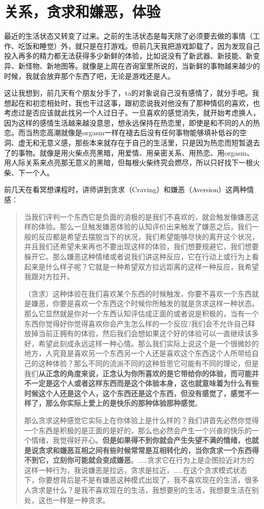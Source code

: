 \chapter{关系，贪求和嫌恶，体验}



最近的生活状态又转变了过来。之前的生活状态是每天除了必须要去做的事情（工作、吃饭和睡觉）外，就只是在打游戏。但前几天我把游戏卸载了，因为发现自己投入再多的精力都无法获得多少新鲜的体验，比如说没有了新武器、新技能、新变异、新怪物、新地图等。就像是上周在咨询室里所说的，当新鲜的事物越来越少的时候，我就会放弃那个东西了吧，无论是游戏还是人。

这让我想到，前几天有个朋友分手了，ta的对象说自己没有感情了，就分手吧。我想起在和初恋相处时，我也干过这事，跟初恋说我对他没有了那种情侣的喜欢，也考虑过是否应该就此找另一个人过日子。一旦喜欢的感觉消失，就开始考虑换人，因为这样的感情生活越来越没意思，想永远保持在热恋里，即使是和不同的人的热恋。而当热恋高潮\pozhehao{}就像是orgasm一样\pozhehao{}在褪去后没有任何事物能够填补低谷的空洞、虚无和无意义感，那些本来就存在于自己的生活里，只是因为热恋而短暂退去了的事物。就像是用火柴点亮黑暗，用爱情、用亲密关系、用热恋、用orgasm、用人际关系来点亮那无意义的黑暗，但每根火柴终究会燃尽，所以只好找下一根火柴、下一个人。

前几天在看冥想课程时，讲师讲到贪求（Craving）和嫌恶（Aversion）这两种情感：

\blockquote{
	当我们评判一个东西它是负面的消极的是我们不喜欢的，就会触发像嫌恶这样的体验。那么一旦触发嫌恶体验的认知评价出来触发了嫌恶之后，我们一般的反应都是希望去摆脱当下的状况，我们希望能够尽快的离开这个状况，并且我们还希望未来再也不要出现这样的体验，我们想要规避它，我们想要躲开它。那么嫌恶这种情绪或者说我们讲这种反应，它在行动上或行为上看起来是什么样子呢？它就是一种希望双方拉远距离的这样一种反应，我希望我跟对方拉开。

	（贪求）这种体验在我们喜欢某个东西的时候触发，你要不喜欢一个东西就是嫌恶，你要是喜欢一个东西这个时候你所触发的就是贪求这样一种状态。那么它显然就是你对一个东西认知评估成正面的或者说是积极的，当有一个东西你觉得好你觉得喜欢你会产生怎么样的一个反应?我们会不允许自己释放掉当前正拥有的体验，然后我们会想如果这个好的体验可以一直继续该多好，希望此刻成永远这样一种心情。那么我们实际上说这个是一个很微妙的地方，人究竟是喜欢另一个东西另一个人还是喜欢这个东西这个人所带给自己的这种体验？那么不同的流派不同的这种哲思它可能有不同的理论，但是我们\textbf{从正念的角度来说，正念认为你所喜欢的是它带给你的体验，而可能并不一定是这个人或者这样东西而是这个体验本身，这也就意味着为什么有些时候这个人还是这个人，这个东西还是这个东西，但没有感觉了，感觉不一样了，那么你实际上爱上的是快乐的那种体验那种感觉}。

	那么贪求这种感觉它实际上在你体验上是什么样的？我们讲首先必然你觉得一个东西是积极的是正面的是好的，那么也必然会产生一个兴奋的快乐的一个情绪，我觉得好开心。\textbf{但是如果得不到你就会产生失望不满的情绪，也就是说贪求和嫌恶互相之间有些时候常常是互相转化的，当你贪求一个东西得不到它，立刻你可能就会变成嫌恶}。……贪求它在行为上是企图拉近对方的这样一种行为，我说嫌恶是拉远，贪求是拉近，……在这个贪求模式状态下，你要想背后是不是有嫌恶这种模式出现了，我不喜欢现在的生活，很多人贪求是什么？是我不喜欢现在的生活，我想要别的生活，我想要生活在别处，这也一样是一种贪求。
}

